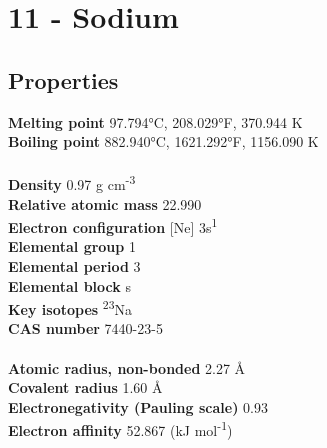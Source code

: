 \section{11 - Sodium}
\label{sec:elem-sodium}
\subsection{Properties}
\textbf{Melting point} 97.794°C, 208.029°F, 370.944 K\\
\textbf{Boiling point} 882.940°C, 1621.292°F, 1156.090 K\\
\\
\textbf{Density} 0.97 g cm\textsuperscript{-3}\\
\textbf{Relative atomic mass} 22.990\\
\textbf{Electron configuration} [Ne] 3s\textsuperscript{1}\\
\textbf{Elemental group} 1\\
\textbf{Elemental period} 3\\
\textbf{Elemental block} s\\
\textbf{Key isotopes} \textsuperscript{23}Na\\
\textbf{CAS number} 7440-23-5\\
\\
\textbf{Atomic radius, non-bonded} 2.27 Å\\
\textbf{Covalent radius} 1.60 Å\\
\textbf{Electronegativity (Pauling scale)} 0.93\\
\textbf{Electron affinity} 52.867 (kJ mol\textsuperscript{-1})\\